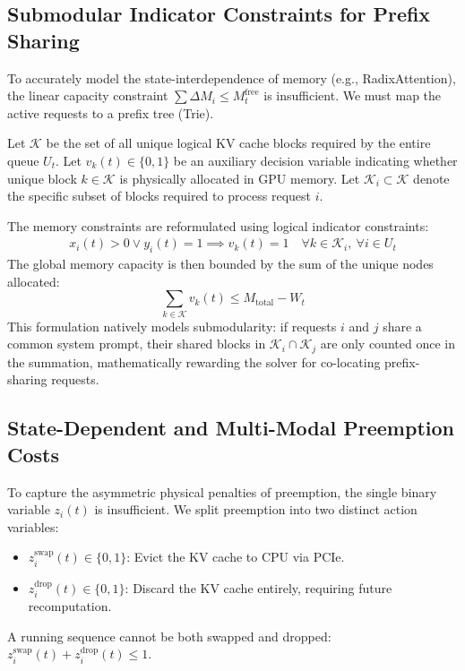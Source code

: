 \documentclass[11pt]{article}
\begin{document}
\subsection{Submodular Indicator Constraints for Prefix Sharing}
\label{subsec:ext_prefix_sharing}

To accurately model the state-interdependence of memory (e.g., RadixAttention), the linear capacity constraint $\sum \Delta M_i \le M_t^{\mathrm{free}}$ is insufficient. We must map the active requests to a prefix tree (Trie).

Let $\mathcal{K}$ be the set of all unique logical KV cache blocks required by the entire queue $U_t$. Let $v_k(t) \in \{0, 1\}$ be an auxiliary decision variable indicating whether unique block $k \in \mathcal{K}$ is physically allocated in GPU memory. Let $\mathcal{K}_i \subset \mathcal{K}$ denote the specific subset of blocks required to process request $i$.

The memory constraints are reformulated using logical indicator constraints:
\begin{align}
    x_i(t) > 0 \lor y_i(t) = 1 \implies v_k(t) = 1 \quad \forall k \in \mathcal{K}_i, \ \forall i \in U_t
\end{align}
The global memory capacity is then bounded by the sum of the unique nodes allocated:
\begin{equation}
    \sum_{k \in \mathcal{K}} v_k(t) \le M_{\text{total}} - W_t
\end{equation}
This formulation natively models submodularity: if requests $i$ and $j$ share a common system prompt, their shared blocks in $\mathcal{K}_i \cap \mathcal{K}_j$ are only counted once in the summation, mathematically rewarding the solver for co-locating prefix-sharing requests.

\subsection{State-Dependent and Multi-Modal Preemption Costs}
\label{subsec:ext_preemption_costs}

To capture the asymmetric physical penalties of preemption, the single binary variable $z_i(t)$ is insufficient. We split preemption into two distinct action variables:
\begin{itemize}
    \item $z_i^{\text{swap}}(t) \in \{0, 1\}$: Evict the KV cache to CPU via PCIe.
    \item $z_i^{\text{drop}}(t) \in \{0, 1\}$: Discard the KV cache entirely, requiring future recomputation.
\end{itemize}
A running sequence cannot be both swapped and dropped: $z_i^{\text{swap}}(t) + z_i^{\text{drop}}(t) \le 1$.
\end{document}
